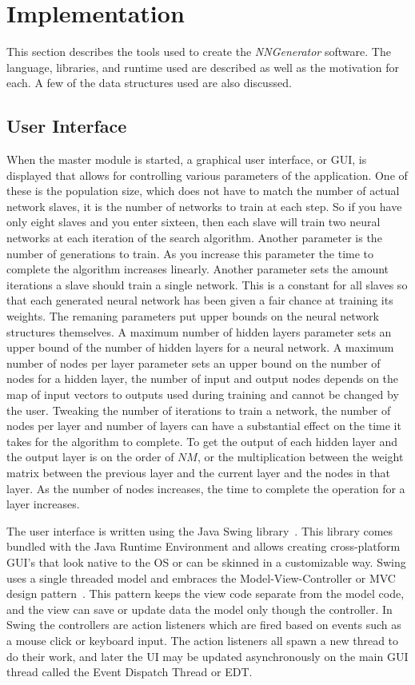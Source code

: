 \chapter[Implementation]{Implementation}
This section describes the tools used to create the {\em NNGenerator} software. The language, libraries, and runtime used are described as well as the motivation for each. A few of the data structures used are also discussed.



\section{User Interface}
When the master module is started, a graphical user interface, or GUI, is displayed that allows for controlling various parameters of the application. 
One of these is the population size, which does not have to match the number of actual network slaves, it is the number of networks to train at each step. 
So if you have only eight slaves and you enter sixteen, then each slave will train two neural networks at each iteration of the search algorithm. 
Another parameter is the number of generations to train. 
As you increase this parameter the time to complete the algorithm increases linearly. 
Another parameter sets the amount iterations a slave should train a single network. 
This is a constant for all slaves so that each generated neural network has been given a fair chance at training its weights. 
The remaning parameters put upper bounds on the neural network structures themselves. 
A maximum number of hidden layers parameter sets an upper bound of the number of hidden layers for a neural network. 
A maximum number of nodes per layer parameter sets an upper bound on the number of nodes for a hidden layer, the number of input and output nodes depends on the map of input vectors to outputs used during training and cannot be changed by the user. 
Tweaking the number of iterations to train a network, the number of nodes per layer and number of layers can have a substantial effect on the time it takes for the algorithm to complete. 
To get the output of each hidden layer and the output layer is on the order of $NM$, or the multiplication between the weight matrix between the previous layer and the current layer and the nodes in that layer. 
As the number of nodes increases, the time to complete the operation for a layer increases.

The user interface is written using the Java Swing library~\cite{swing}. This library comes bundled with the Java Runtime Environment and allows creating cross-platform GUI's that look native to the OS or can be skinned in a customizable way. Swing uses a single threaded model and embraces the Model-View-Controller or MVC design pattern~\cite{mvc}. This pattern keeps the view code separate from the model code, and the view can save or update data the model only though the controller. In Swing the controllers are action listeners which are fired based on events such as a mouse click or keyboard input. The action listeners all spawn a new thread to do their work, and later the UI may be updated asynchronously on the main GUI thread called the Event Dispatch Thread or EDT.

